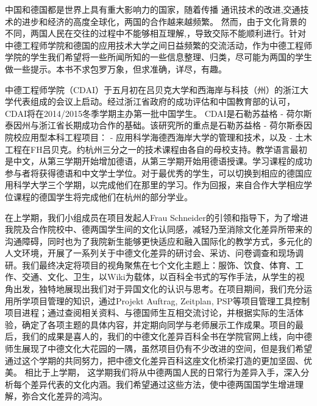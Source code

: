 \begin{minipage}{\linewidth}
\Huge\sffamily{} \par
\end{minipage}
\thispagestyle{empty}
 \vspace*{3cm}
 中国和德国都是世界上具有重大影响力的国家，随着传播 通讯技术的改进,交通技术的进步和经济的高度全球化，两国的合作越来越频繁。 然而，由于文化背景的不同，两国人民在交往的过程中不能够相互理解,，导致交际不能顺利进行。针对中德工程师学院和德国的应用技术大学之间日益频繁的交流活动，作为中德工程师学院的学生我们希望将一些所闻所知的一些信息整理、归类，尽可能为两国的学生做一些提示。本书不求包罗万象，但求准确，详尽，有趣。
\par
中德工程师学院（CDAI）于五月初在吕贝克大学和西海岸与科技（州）的浙江大学代表组成的会议上启动。经过浙江省政府的成功评估和中国教育部的认可，CDAI将在2014/2015冬季学期主办第一批中国学生。 CDAI是石勒苏益格 - 荷尔斯泰因州与浙江省长期成功合作的基础。该研究所的重点是石勒苏益格 - 荷尔斯泰因院校应用型本科工程项目： - 应用科学海德西海岸大学的管理和技术，以及 - 土木工程在FH吕贝克。约杭州三分之一的技术课程由各自的母校支持。教学语言最初是中文，从第三学期开始增加德语，从第三学期开始用德语授课。学习课程的成功参与者将获得德语和中文学士学位。对于最优秀的学生，可以切换到相应的德国应用科学大学三个学期，以完成他们在那里的学习。作为回报，来自合作大学相应学位课程的德国学生将完成他们在杭州的部分学业。
\par
 在上学期，我们小组成员在项目发起人Frau Schneider的引领和指导下，为了增进我院及合作院校中、德两国学生间的文化认同感，减轻乃至消除文化差异所带来的沟通障碍，同时也为了我院新生能够更快适应和融入国际化的教学方式，多元化的人文环境，开展了一系列关于中德文化差异的研讨会、采访、问卷调查和现场调研。我们最终决定将项目的视角聚焦在七个文化主题上：服饰、饮食、体育、工作、交通、文化、卫生，以Wiki为载体，以百科全书式的写作手法，从学生的视角出发，独特地展现出我们对于异国文化的认识与思考。在项目期间，我们充分运用所学项目管理的知识，通过Projekt Auftrag, Zeitplan, PSP等项目管理工具控制项目进程；通过查阅相关资料、与德国师生互相交流讨论，并根据实际的生活体验，确定了各项主题的具体内容，并定期向同学与老师展示工作成果。项目的最后，我们的成果是喜人的，我们的中德文化差异百科全书在学院官网上线，向中德师生展现了中德文化大花园的一隅，虽然项目仍有不少改进的空间，但是我们希望通过这个学期的共同努力，把中德文化差异百科这座文化桥梁打造的更加坚固、优美。
 相比于上学期， 这学期我们将从中德两国人民的日常行为差异入手，深入分析每个差异代表的文化内涵。我们希望通过这些方法，使中德两国国学生增进理解，弥合文化差异的鸿沟。
